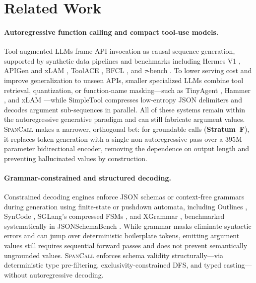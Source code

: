 \section{Related Work}

\paragraph{Autoregressive function calling and compact tool-use models.}
Tool-augmented LLMs \citep{schick2023toolformer,yao2023react,patil2023gorilla,qin2024toolllm} frame API invocation as causal sequence generation, supported by synthetic data pipelines and benchmarks including Hermes V1 \citep{teknium2024hermes}, APIGen and xLAM \citep{liu2024apigen,zhang2024xlam}, ToolACE \citep{liu2025toolace}, BFCL \citep{yan2024bfcl}, and $\tau$-bench \citep{yao2025taubench}. To lower serving cost and improve generalization to unseen APIs, smaller specialized LLMs combine tool retrieval, quantization, or function-name masking---such as TinyAgent \citep{erdogan2024tinyagent}, Hammer \citep{lin2025hammer}, and xLAM \citep{zhang2024xlam}---while SimpleTool \citep{shi2026simpletool} compresses low-entropy JSON delimiters and decodes argument sub-sequences in parallel. All of these systems remain within the autoregressive generative paradigm and can still fabricate argument values. \textsc{SpanCall} makes a narrower, orthogonal bet: for groundable calls (\textbf{Stratum~F}), it replaces token generation with a single non-autoregressive pass over a 395M-parameter bidirectional encoder, removing the dependence on output length and preventing hallucinated values by construction.

\paragraph{Grammar-constrained and structured decoding.}
Constrained decoding engines enforce JSON schemas or context-free grammars during generation using finite-state or pushdown automata, including Outlines \citep{willard2023outlines}, SynCode \citep{ugare2025syncode}, SGLang's compressed FSMs \citep{zheng2024sglang}, and XGrammar \citep{dong2025xgrammar}, benchmarked systematically in JSONSchemaBench \citep{geng2025jsonschemabench}. While grammar masks eliminate syntactic errors and can jump over deterministic boilerplate tokens, emitting argument values still requires sequential forward passes and does not prevent semantically ungrounded values. \textsc{SpanCall} enforces schema validity structurally---via deterministic type pre-filtering, exclusivity-constrained DFS, and typed casting---without autoregressive decoding.

